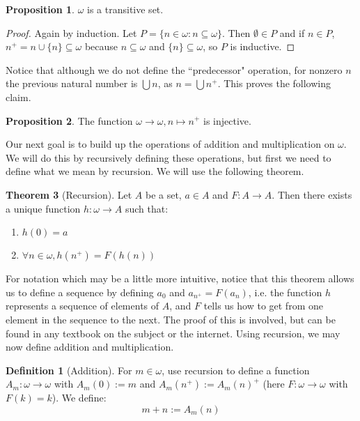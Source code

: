 \documentclass[11pt, oneside]{article}   	%
\theoremstyle{definition}
\newtheorem{definition}{Definition}[section]
\newtheorem{theorem}{Theorem}[section]
\newtheorem{prop}[theorem]{Proposition}
\begin{document}
\begin{prop}
	$\omega$ is a transitive set.
\end{prop}
\begin{proof}
	Again by induction. Let $P = \{n\in\omega : n\subseteq\omega\}$. Then $\emptyset\in P$ and if $n\in P$, $n^+ = n\cup
	\{n\}\subseteq\omega$ because $n\subseteq\omega$ and $\{n\}\subseteq\omega$, so $P$ is inductive.
\end{proof}

Notice that although we do not define the ``predecessor" operation, for nonzero $n$ the previous natural number is 
$\bigcup n$, as $n = \bigcup n^+$. This proves the following claim.
\begin{prop}
	The function $\omega\rightarrow\omega, n\mapsto n^+$ is injective. 
\end{prop}

Our next goal is to build up the operations of addition and multiplication on $\omega$. We will do this by recursively defining 
these operations, but first we need to define what we mean by recursion. We will use the following theorem.

\begin{theorem}[Recursion]
	Let $A$ be a set, $a\in A$ and $F : A\rightarrow A$. Then there exists a unique function $h : \omega\rightarrow A$ 
	such that:
	\begin{enumerate}
		\item $h(0) = a$
		\item $\forall n\in\omega, h(n^+) = F(h(n))$
	\end{enumerate}
\end{theorem}
For notation which may be a little more intuitive, notice that this theorem allows us to define a sequence by defining $a_0$ and 
$a_{n^+} = F(a_n)$, i.e. the function $h$ represents a sequence of elements of $A$, and $F$ tells us how to get from 
one element in the sequence to the next. The proof of this is involved, but can be found in any textbook on the subject or the 
internet. Using recursion, we may now define addition and multiplication.

\begin{definition}[Addition]
	For $m\in\omega$, use recursion to define a function $A_m : \omega\rightarrow\omega$ with $A_m(0) := m$ 
	and $A_m(n^+) := A_m(n)^+$ (here $F : \omega\rightarrow\omega$ with $F(k) = k$). We define:
	\begin{equation}
		m + n := A_m(n)
	\end{equation}
\end{definition}
\end{document}
